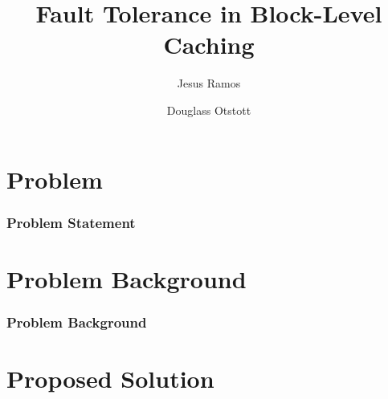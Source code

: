 \documentclass{beamer}
\title{Fault Tolerance in Block-Level Caching}
\author{Jesus Ramos \and Douglass Otstott}
\institute[FIU]{Florida International University}
\date{}
\begin{document}
\maketitle

\section{Problem}

\begin{frame}
  \frametitle{Problem Statement}

\end{frame}

\section{Problem Background}

\begin{frame}
  \frametitle{Problem Background}

\end{frame}

\section{Proposed Solution}
\end{document}
